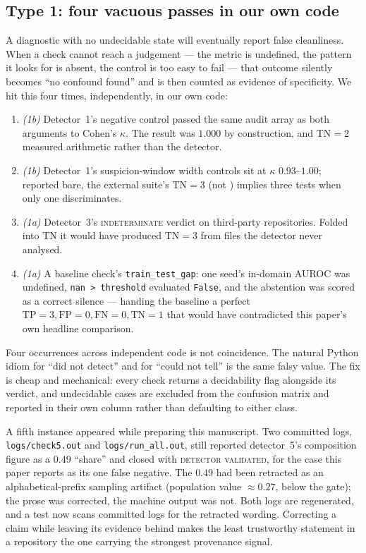 \documentclass[pmlr,twocolumn,10pt]{jmlr}
\begin{document}
\subsection{Type 1: four vacuous passes in our own code}

A diagnostic with no undecidable state will eventually report false
cleanliness. When a check cannot reach a judgement --- the metric is undefined,
the pattern it looks for is absent, the control is too easy to fail --- that
outcome silently becomes ``no confound found'' and is then counted as evidence
of specificity. We hit this four times, independently, in our own code:

\begin{enumerate}
\itemsep0em
  \item \emph{(1b)} Detector~1's negative control passed the same audit array as
    both arguments to Cohen's $\kappa$. The result was $1.000$ by construction,
    and $\mathrm{TN}=2$ measured arithmetic rather than the detector.
  \item \emph{(1b)} Detector~1's suspicion-window width controls sit at $\kappa$
    $0.93$--$1.00$; reported bare, the external suite's $\mathrm{TN}=3$ (not
    ) implies three tests when only one discriminates.
  \item \emph{(1a)} Detector~3's \textsc{indeterminate} verdict on third-party
    repositories. Folded into TN it would have produced $\mathrm{TN}=3$ from
    files the detector never analysed.
  \item \emph{(1a)} A baseline check's \texttt{train\_test\_gap}: one seed's
    in-domain AUROC was undefined, \texttt{nan > threshold} evaluated
    \texttt{False}, and the abstention was scored as a correct silence --- handing
    the baseline a perfect $\mathrm{TP}=3, \mathrm{FP}=0, \mathrm{FN}=0,
    \mathrm{TN}=1$ that would have contradicted this paper's own headline
    comparison.
\end{enumerate}

Four occurrences across independent code is not coincidence. The natural Python
idiom for ``did not detect'' and for ``could not tell'' is the same falsy value.
The fix is cheap and mechanical: every check returns a decidability flag
alongside its verdict, and undecidable cases are excluded from the confusion
matrix and reported in their own column rather than defaulting to either class.

A fifth instance appeared while preparing this manuscript. Two committed logs,
\texttt{logs/check5.out} and \texttt{logs/run\_all.out}, still reported
detector~5's composition figure as a $0.49$ ``share'' and closed with
\textsc{detector validated}, for the case this paper reports as its one false
negative. The $0.49$ had been retracted as an alphabetical-prefix sampling
artifact (population value ${\approx}0.27$, below the gate); the prose was
corrected, the machine output was not. Both logs are regenerated, and a test now
scans committed logs for the retracted wording. Correcting a claim while leaving
its evidence behind makes the least trustworthy statement in a repository the one
carrying the strongest provenance signal.
\end{document}
